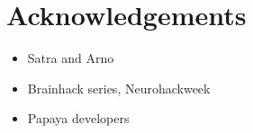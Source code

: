 \section{Acknowledgements}
\begin{itemize}
\item Satra and Arno
\item Brainhack series, Neurohackweek
\item Papaya developers
\end{itemize}
